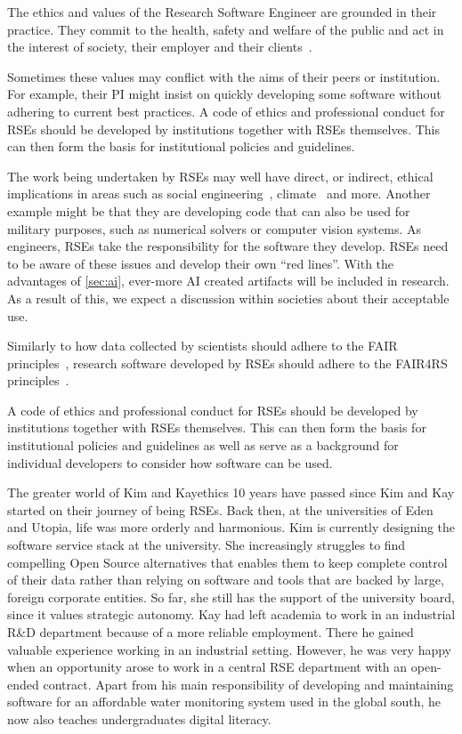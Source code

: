 \documentclass{eceasst}
\begin{document}
The ethics and values of the Research Software Engineer are grounded in their practice.
They commit to the health, safety and welfare of the public and act in the interest of society, their employer and their clients~\cite{Goth2024}.

Sometimes these values may conflict with the aims of their peers or institution.
For example, their PI might insist on quickly developing some software without adhering to current best practices.
A code of ethics and professional conduct for RSEs should be developed by institutions together with RSEs themselves.
This can then form the basis for institutional policies and guidelines.

The work being undertaken by RSEs may well have direct, or indirect,
ethical implications in areas such as social engineering~\cite{s2erc,Siadati2024},
climate~\cite{Lannelongue2023} and more.
Another example might be that they are developing code that can also be used
for military purposes, such as numerical solvers or computer vision systems.
As engineers, RSEs take the responsibility for the software they develop.
RSEs need to be aware of these issues and develop their own ``red lines''.
With the advantages of \autoref{sec:ai}, ever-more AI created artifacts will be included in research.
As a result of this, we expect a discussion within societies about their acceptable use.

Similarly to how data collected by scientists should adhere to the FAIR principles~\cite{FAIR},
research software developed by RSEs should adhere to the FAIR4RS principles~\cite{FAIR4RS}.

A code of ethics and professional conduct for RSEs should be developed by institutions together with RSEs themselves.
This can then form the basis for institutional policies and guidelines as well as serve as a background for individual developers to consider how software can be used.

\begin{story}{The greater world of Kim and Kay}{ethics}
10 years have passed since Kim and Kay started on their journey of being RSEs. Back then,
at the universities of Eden and Utopia, life was more orderly and harmonious.
Kim is currently designing the software service stack at the university.
She increasingly struggles to find compelling Open Source alternatives that enables them to keep complete control of their data
rather than relying on software and tools that are backed by large, foreign corporate entities.
So far, she still has the support of the university board, since it values strategic autonomy.
Kay had left academia to work in an industrial R\&D department because of a more reliable employment.
There he gained valuable experience working in an industrial setting.
However, he was very happy when an opportunity arose to work in a central
RSE department with an open-ended contract. Apart from his main responsibility
of developing and maintaining software for an affordable water monitoring system
used in the global south, he now also teaches undergraduates digital literacy.
\end{story}
\end{document}
